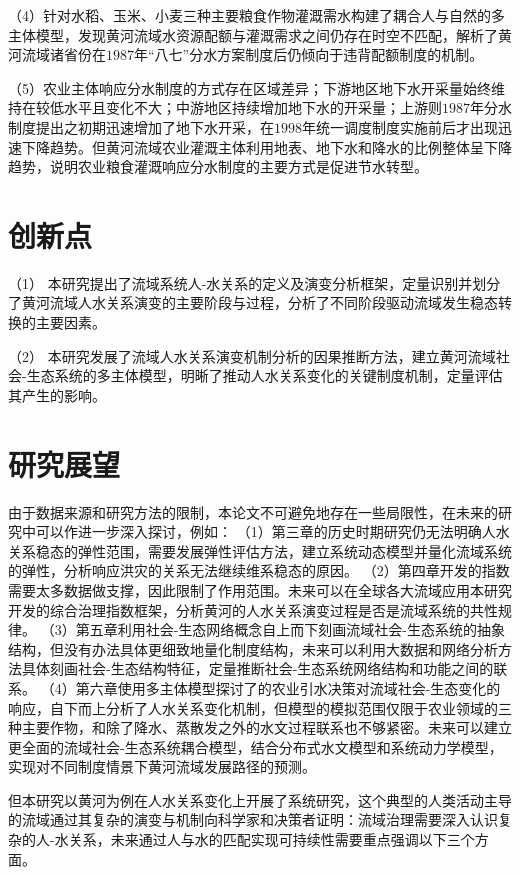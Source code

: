 （4）针对水稻、玉米、小麦三种主要粮食作物灌溉需水构建了耦合人与自然的多主体模型，发现黄河流域水资源配额与灌溉需求之间仍存在时空不匹配，解析了黄河流域诸省份在$1987$年“八七”分水方案制度后仍倾向于违背配额制度的机制。

（5）农业主体响应分水制度的方式存在区域差异；下游地区地下水开采量始终维持在较低水平且变化不大；中游地区持续增加地下水的开采量；上游则$1987$年分水制度提出之初期迅速增加了地下水开采，在$1998$年统一调度制度实施前后才出现迅速下降趋势。但黄河流域农业灌溉主体利用地表、地下水和降水的比例整体呈下降趋势，说明农业粮食灌溉响应分水制度的主要方式是促进节水转型。

\section{创新点}

（1） 本研究提出了流域系统人-水关系的定义及演变分析框架，定量识别并划分了黄河流域人水关系演变的主要阶段与过程，分析了不同阶段驱动流域发生稳态转换的主要因素。

（2） 本研究发展了流域人水关系演变机制分析的因果推断方法，建立黄河流域社会-生态系统的多主体模型，明晰了推动人水关系变化的关键制度机制，定量评估其产生的影响。

\section{研究展望}

由于数据来源和研究方法的限制，本论文不可避免地存在一些局限性，在未来的研究中可以作进一步深入探讨，例如：
（1）第三章的历史时期研究仍无法明确人水关系稳态的弹性范围，需要发展弹性评估方法，建立系统动态模型并量化流域系统的弹性，分析响应洪灾的关系无法继续维系稳态的原因。
（2）第四章开发的指数需要太多数据做支撑，因此限制了作用范围。未来可以在全球各大流域应用本研究开发的综合治理指数框架，分析黄河的人水关系演变过程是否是流域系统的共性规律。
（3）第五章利用社会-生态网络概念自上而下刻画流域社会-生态系统的抽象结构，但没有办法具体更细致地量化制度结构，未来可以利用大数据和网络分析方法具体刻画社会-生态结构特征，定量推断社会-生态系统网络结构和功能之间的联系。
（4）第六章使用多主体模型探讨了的农业引水决策对流域社会-生态变化的响应，自下而上分析了人水关系变化机制，但模型的模拟范围仅限于农业领域的三种主要作物，和除了降水、蒸散发之外的水文过程联系也不够紧密。未来可以建立更全面的流域社会-生态系统耦合模型，结合分布式水文模型和系统动力学模型，实现对不同制度情景下黄河流域发展路径的预测。

但本研究以黄河为例在人水关系变化上开展了系统研究，这个典型的人类活动主导的流域通过其复杂的演变与机制向科学家和决策者证明：流域治理需要深入认识复杂的人-水关系，未来通过人与水的匹配实现可持续性需要重点强调以下三个方面。

